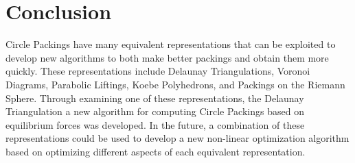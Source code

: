 \documentclass[11pt]{article}
\theoremstyle{definition}
\begin{document}
\section{Conclusion}

	Circle Packings have many equivalent representations that can be exploited to develop new algorithms to both make better packings and obtain them more quickly. 
	These representations include Delaunay Triangulations, Voronoi Diagrams, Parabolic Liftings, Koebe Polyhedrons, and Packings on the Riemann Sphere. 
	Through examining one of these representations, the Delaunay Triangulation a new algorithm for computing Circle Packings based on equilibrium forces was developed. 
	In the future, a combination of these representations could be used to develop a new non-linear optimization algorithm based on optimizing different aspects of each equivalent representation.



\end{document}
